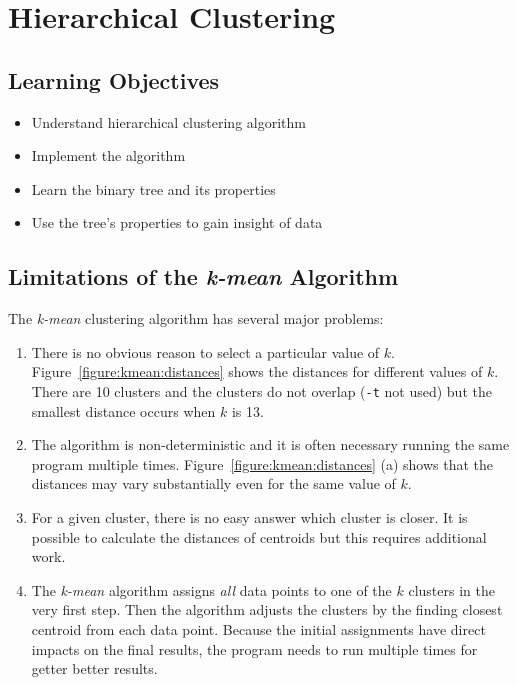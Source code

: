 \chapter{Hierarchical Clustering}


\section{Learning Objectives}

\begin{itemize}

\item Understand hierarchical clustering algorithm

\item Implement the algorithm
  
\item Learn the binary tree and its properties

\item Use the tree's properties to gain insight of data
  
\end{itemize}

\section{Limitations of the {\it k-mean} Algorithm}

The {\it k-mean} clustering algorithm has several major problems:
\begin{enumerate}
  \item 
There is no obvious reason to select a particular value of $k$.
Figure~\ref{figure:kmean:distances} shows the distances for different
values of $k$. There are 10 clusters and the clusters do not overlap
({\tt -t} not used) but the smallest distance occurs when $k$ is 13.

\item The algorithm is non-deterministic and it is often necessary
  running the same program multiple times.
  Figure~\ref{figure:kmean:distances} (a) shows that the distances may
  vary substantially even for the same value of $k$.

\item For a given cluster, there is no easy answer which cluster is
  closer.  It is possible to calculate the distances of centroids but
  this requires additional work.

\item The {\it k-mean} algorithm assigns {\it all} data points to one
  of the $k$ clusters in the very first step.  Then the algorithm
  adjusts the clusters by the finding closest centroid from each data
  point. Because the initial assignments have direct impacts on the
  final results, the program needs to run multiple times for getter
  better results.  
\end{enumerate}


